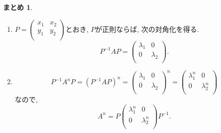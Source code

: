 \documentclass[dvipdfmx,a4paper,11pt]{article} %
\theoremstyle{definition}
\newtheorem{suma}[thm]{まとめ}
\begin{document}
\begin{suma}
\begin{enumerate}
\item[手順3.]  
$P=\begin{pmatrix}
x_1& x_2 \\
y_1& y_2 \\
\end{pmatrix}$とおき, $P$が正則ならば, 次の対角化を得る.
$$
P^{-1} A P=
\begin{pmatrix}
\lambda_1& 0 \\
0& \lambda_2\\
\end{pmatrix}.
$$ 
\item[手順4]
$$
P^{-1} A^n  P=
(P^{-1} A P)^n=
\begin{pmatrix}
\lambda_1& 0 \\
0& \lambda_2\\
\end{pmatrix}^n
=
\begin{pmatrix}
\lambda_1^n& 0 \\
0& \lambda_2^n\\
\end{pmatrix}
$$
なので,
$$
A^n = 
P
\begin{pmatrix}
\lambda_1^n& 0 \\
0& \lambda_2^n\\
\end{pmatrix}
P^{-1}.
$$
\end{enumerate}
 \end{suma}
\end{document}
